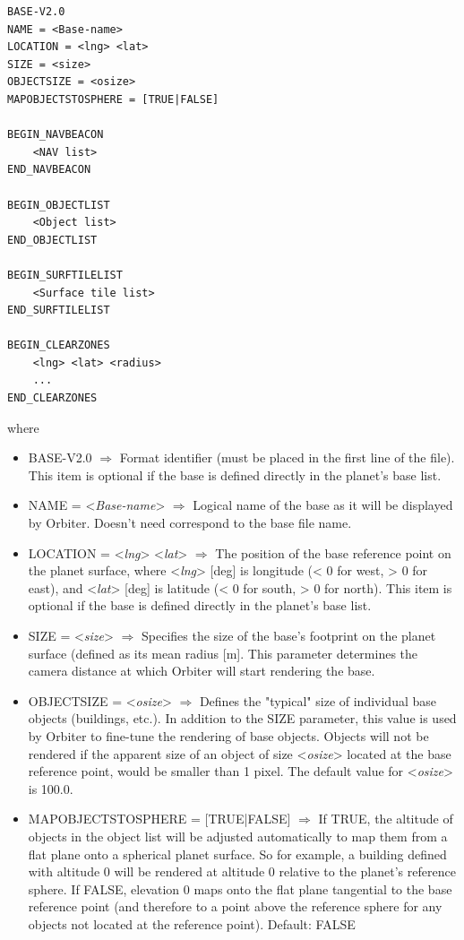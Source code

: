\documentclass[Orbiter Developer Manual.tex]{subfiles}
\begin{document}
\begin{lstlisting}[language=OSFS]
BASE-V2.0
NAME = <Base-name>
LOCATION = <lng> <lat>
SIZE = <size>
OBJECTSIZE = <osize>
MAPOBJECTSTOSPHERE = [TRUE|FALSE]

BEGIN_NAVBEACON
	<NAV list>
END_NAVBEACON

BEGIN_OBJECTLIST
	<Object list>
END_OBJECTLIST

BEGIN_SURFTILELIST
	<Surface tile list>
END_SURFTILELIST

BEGIN_CLEARZONES
	<lng> <lat> <radius>
	...
END_CLEARZONES
\end{lstlisting}

\noindent
where

\begin{itemize}
\item BASE-V2.0 $\Rightarrow$ Format identifier (must be placed in the first line of the file). This item is optional if the base is defined directly in the planet's base list.
\item NAME = <\textit{Base-name}> $\Rightarrow$ Logical name of the base as it will be displayed by Orbiter. Doesn't need correspond to the base file name.
\item LOCATION = <\textit{lng}> <\textit{lat}> $\Rightarrow$ The position of the base reference point on the planet surface, where <\textit{lng}> [deg] is longitude (< 0 for west, > 0 for east), and <\textit{lat}> [deg] is latitude (< 0 for south, > 0 for north). This item is optional if the base is defined directly in the planet's base list.
\item SIZE = <\textit{size}> $\Rightarrow$ Specifies the size of the base's footprint on the planet surface (defined as its mean radius [m]. This parameter determines the camera distance at which Orbiter will start rendering the base.
\item OBJECTSIZE = <\textit{osize}> $\Rightarrow$ Defines the "typical" size of individual base objects (buildings, etc.). In addition to the SIZE parameter, this value is used by Orbiter to fine-tune the rendering of base objects. Objects will not be rendered if the apparent size of an object of size <\textit{osize}> located at the base reference point, would be smaller than 1 pixel. The default value for <\textit{osize}> is 100.0.
\item MAPOBJECTSTOSPHERE = [TRUE|FALSE] $\Rightarrow$ If TRUE, the altitude of objects in the object list will be adjusted automatically to map them from a flat plane onto a spherical planet surface. So for example, a building defined with altitude 0 will be rendered at altitude 0 relative to the planet's reference sphere. If FALSE, elevation 0 maps onto the flat plane tangential to the base reference point (and therefore to a point above the reference sphere for any objects not located at the reference point). Default: FALSE\\

\end{itemize}
\end{document}
